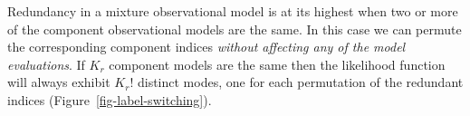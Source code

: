 \documentclass[
  letterpaper,
  DIV=11,
  numbers=noendperiod]{scrartcl}
\begin{document}
Redundancy in a mixture observational model is at its highest when two
or more of the component observational models are the same. In this case
we can permute the corresponding component indices \emph{without
affecting any of the model evaluations}. If \(K_{r}\) component models
are the same then the likelihood function will always exhibit \(K_{r}!\)
distinct modes, one for each permutation of the redundant indices
(Figure~\ref{fig-label-switching}).

\begin{figure}

\begin{minipage}{0.28\linewidth}
~\end{minipage}%
%
\begin{minipage}{0.45\linewidth}


\subcaption{\label{fig-label-switching-like}}

\end{minipage}%
%
\begin{minipage}{0.28\linewidth}
~\end{minipage}%
\newline
\begin{minipage}{0.05\linewidth}
~\end{minipage}%
%
\begin{minipage}{0.45\linewidth}

\centering{

}
\end{minipage}
\end{figure}
\end{document}

